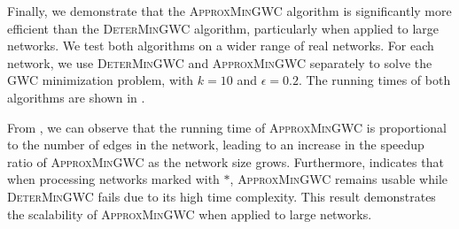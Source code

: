 \documentclass[10pt,twocolumn,twoside]{IEEEtran}
\begin{document}
Finally, we demonstrate that the \textsc{ApproxMinGWC} algorithm is significantly more efficient than the \textsc{DeterMinGWC} algorithm, particularly when applied to large networks.
We test both algorithms on a wider range of real networks.
For each network, we use \textsc{DeterMinGWC} and \textsc{ApproxMinGWC} separately to solve the GWC minimization problem, with \(k=10\) and \(\epsilon=0.2\).
The running times of both algorithms are shown in .

From , we can observe that the running time of \textsc{ApproxMinGWC} is proportional to the number of edges in the network, leading to an increase in the speedup ratio of \textsc{ApproxMinGWC} as the network size grows.
Furthermore,  indicates that when processing networks marked with \(\ast\),
\textsc{ApproxMinGWC} remains usable while \textsc{DeterMinGWC} fails due to its high time complexity.
This result demonstrates the scalability of \textsc{ApproxMinGWC} when applied to large networks.
\end{document}
